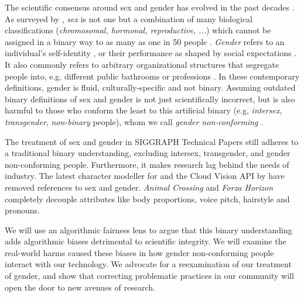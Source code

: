 \documentclass[sigconf,balance=false]{acmart}
\begin{document}





The scientific consensus around sex and gender has evolved in the past decades \cite{pmid30377332}. As surveyed by \citet{fausto2012sex}, \emph{sex} is not one but a combination of many biological classifications (\emph{chromosomal, hormonal, reproductive, ...}) which cannot be assigned in a binary way to as many as one in 50 people \cite{blackless2000sexually}.
\emph{Gender} refers to an individual's self-identity \cite{money1972man}, or their performance as shaped by social expectations \cite{butler2003gender}. It also commonly refers to arbitrary organizational structures that segregate people into, e.g. different public bathrooms or professions \cite{lorber1994paradoxes}. In these contemporary definitions, gender is fluid, culturally-specific and not binary. Assuming outdated binary definitions of sex and gender is not just scientifically incorrect, but is also harmful to those who conform the least to this artificial binary (e.g, \emph{intersex}, \emph{transgender}, \emph{non-binary} people), whom we call \emph{gender non-conforming} \cite{un2015report}.

The treatment of sex and gender in SIGGRAPH Technical Papers
still adheres to a traditional binary understanding, excluding intersex, transgender, and
gender non-conforming people. Furthermore, it makes research lag behind the needs of industry. The latest character modeller for \citet{metahuman} and the Cloud Vision API by \citet{googlegender} have removed references to sex and gender. \emph{Animal Crossing} and \emph{Forza Horizon} completely decouple attributes like body proportions, voice pitch, hairstyle and pronouns. 

We will use an algorithmic fairness lens to argue that this binary understanding adds algorithmic biases detrimental to scientific integrity.
We will examine the real-world harms caused these biases in how gender non-conforming people interact with
our technology. We advocate for a reexamination of our treatment of gender, and show that correcting problematic practices in
our community will open the door to new avenues of research.
\end{document}
